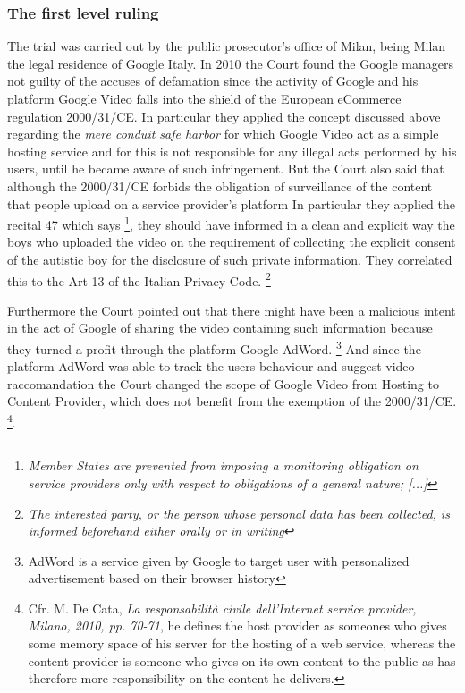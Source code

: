 \documentclass[runningheads,a4paper]{llncs}
\begin{document}
\subsubsection{The first level ruling}
The trial was carried out by the public prosecutor's office of Milan, being Milan the legal residence of Google Italy\cite{NOTARI}. 
In 2010 the Court found the Google managers not guilty of the accuses of defamation since the activity of Google and his platform Google Video falls into the shield of the European eCommerce regulation 2000/31/CE. In particular they applied the concept discussed above regarding the \textit{mere conduit safe harbor} for which Google Video act as a simple hosting service and for this is not responsible for any illegal acts performed by his users, until he became aware of such infringement.
But the Court also said that although the 2000/31/CE forbids the obligation of surveillance of the content that people upload on a service provider's platform
In particular they applied the recital 47 which says \footnote{
\textit{
 Member States are prevented from imposing a monitoring obligation on service providers only with respect to obligations of a general nature; [...]}
 },
they should have informed in a clean and explicit way the boys who uploaded the video on the requirement of collecting the explicit consent of the autistic boy  for the disclosure of such private information. They correlated this to the Art 13 of the Italian Privacy Code. \footnote{\textit{The interested party, or the person whose personal data has been collected, is informed beforehand either orally or in writing}}

Furthermore the Court pointed out that there might have been a malicious intent in the act of Google of sharing the video containing such information because they turned a profit through the platform Google AdWord. 
\footnote{AdWord is a service given by Google to target user with personalized advertisement based on their browser history} 
And since the platform AdWord was able to track the users behaviour and suggest video raccomandation the Court changed the scope of Google Video from Hosting to Content Provider, which does not benefit from the exemption of the 2000/31/CE. 
\footnote{
Cfr. M. De Cata, \textit{La responsabilità civile dell'Internet service provider, Milano, 2010, pp. 70-71}, he defines the host provider as someones who gives some memory space of his server for the hosting of a web service, whereas the content provider is someone who gives on its own content to the public as has therefore more responsibility on the content he delivers. 
}.
\end{document}
